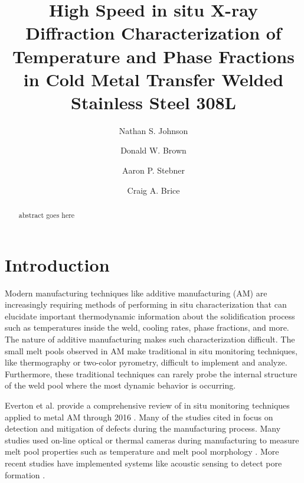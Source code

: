 \documentclass[twocolumn,nofootinbib,notitlepage,aps]{revtex4-1}
\begin{document}
\title{High Speed in situ X-ray Diffraction Characterization of Temperature and Phase Fractions in Cold Metal Transfer Welded Stainless Steel 308L}
\author{Nathan S. Johnson}

\author{Donald W. Brown}

\author{Aaron P. Stebner}

\author{Craig A. Brice}


\begin{abstract}
abstract goes here
\end{abstract}

\maketitle

\section{Introduction}
Modern manufacturing techniques like additive manufacturing (AM) are increasingly requiring methods of performing in situ characterization that can elucidate important thermodynamic information about the solidification process such as temperatures inside the weld, cooling rates, phase fractions, and more. The nature of additive manufacturing makes such characterization difficult. The small melt pools observed in AM make traditional in situ monitoring techniques, like thermography or two-color pyrometry, difficult to implement and analyze. Furthermore, these traditional techniques can rarely probe the internal structure of the weld pool where the most dynamic behavior is occurring. 

Everton et al. provide a comprehensive review of in situ monitoring techniques applied to metal AM through 2016 \cite{Everton2016}. Many of the studies cited in \cite{Everton2016} focus on detection and mitigation of defects during the manufacturing process. Many studies used on-line optical or thermal cameras during manufacturing to measure melt pool properties such as temperature \cite{Zalameda2013, Liu2014} and melt pool morphology \cite{Li2018}. More recent studies have implemented systems like acoustic sensing to detect pore formation \cite{Shevchik2018}.
\end{document}
